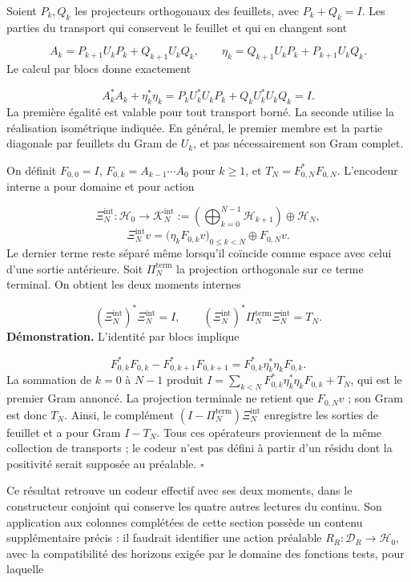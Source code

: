 Soient \(P_k,Q_k\) les projecteurs orthogonaux des feuillets, avec \(P_k+Q_k=I\). Les parties du transport qui conservent le feuillet et qui en changent sont

\[
A_k=P_{k+1}U_kP_k+Q_{k+1}U_kQ_k,
\qquad
\eta_k=Q_{k+1}U_kP_k+P_{k+1}U_kQ_k.
\]
Le calcul par blocs donne exactement

\[
A_k^*A_k+\eta_k^*\eta_k
=P_kU_k^*U_kP_k+Q_kU_k^*U_kQ_k=I.
\]
La première égalité est valable pour tout transport borné. La seconde utilise la réalisation isométrique indiquée. En général, le premier membre est la partie diagonale par feuillets du Gram de \(U_k\), et pas nécessairement son Gram complet.

On définit \(F_{0,0}=I\), \(F_{0,k}=A_{k-1}\cdots A_0\) pour \(k\geq1\), et \(T_N=F_{0,N}^*F_{0,N}\). L’encodeur interne a pour domaine et pour action

\[
\Xi_N^{\mathrm{int}}:\mathscr H_0\longrightarrow
\mathscr K_N^{\mathrm{int}}
:=\left(\bigoplus_{k=0}^{N-1}\mathscr H_{k+1}\right)\oplus\mathscr H_N,
\]
\[
\Xi_N^{\mathrm{int}}v
=\bigl(\eta_kF_{0,k}v\bigr)_{0\leq k<N}\oplus F_{0,N}v.
\]
Le dernier terme reste séparé même lorsqu’il coïncide comme espace avec celui d’une sortie antérieure. Soit \(\Pi_N^{\mathrm{term}}\) la projection orthogonale sur ce terme terminal. On obtient les deux moments internes

\[
(\Xi_N^{\mathrm{int}})^*\Xi_N^{\mathrm{int}}=I,
\qquad
(\Xi_N^{\mathrm{int}})^*\Pi_N^{\mathrm{term}}\Xi_N^{\mathrm{int}}=T_N.
\]
\textbf{Démonstration.} L'identité par blocs implique

\[
F_{0,k}^*F_{0,k}-F_{0,k+1}^*F_{0,k+1}
=F_{0,k}^*\eta_k^*\eta_kF_{0,k}.
\]
La sommation de \(k=0\) à \(N-1\) produit \(I=\sum_{k<N}F_{0,k}^*\eta_k^*\eta_kF_{0,k}+T_N\), qui est le premier Gram annoncé. La projection terminale ne retient que \(F_{0,N}v\) ; son Gram est donc \(T_N\). Ainsi, le complément \((I-\Pi_N^{\mathrm{term}})\Xi_N^{\mathrm{int}}\) enregistre les sorties de feuillet et a pour Gram \(I-T_N\). Tous ces opérateurs proviennent de la même collection de transports ; le codeur n'est pas défini à partir d'un résidu dont la positivité serait supposée au préalable. \hfill\(\square\)

Ce résultat retrouve un codeur effectif avec ses deux moments, dans le constructeur conjoint qui conserve les quatre autres lectures du continu. Son application aux colonnes complétées de cette section possède un contenu supplémentaire précis : il faudrait identifier une action préalable \(R_R:\mathcal D_R\to\mathscr H_0\), avec la compatibilité des horizons exigée par le domaine des fonctions tests, pour laquelle


